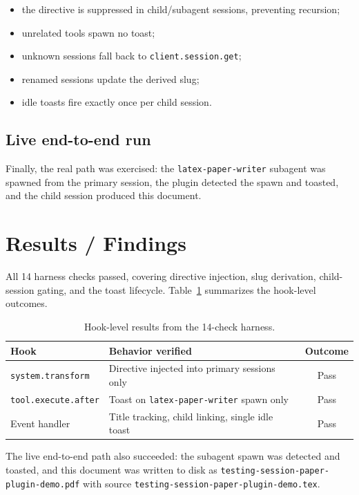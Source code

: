 \documentclass[11pt]{article}
\begin{document}
\begin{itemize}
  \item the directive is suppressed in child/subagent sessions, preventing recursion;
  \item unrelated tools spawn no toast;
  \item unknown sessions fall back to \texttt{client.session.get};
  \item renamed sessions update the derived slug;
  \item idle toasts fire exactly once per child session.
\end{itemize}

\subsection{Live end-to-end run}
Finally, the real path was exercised: the \texttt{latex-paper-writer} subagent was spawned
from the primary session, the plugin detected the spawn and toasted, and the child session
produced this document.

\section{Results / Findings}
\label{sec:results}

All 14 harness checks passed, covering directive injection, slug derivation,
child-session gating, and the toast lifecycle. Table~\ref{tab:hooks} summarizes the
hook-level outcomes.

\begin{table}[h]
  \centering
  \begin{tabular}{@{}llc@{}}
    \toprule
    Hook & Behavior verified & Outcome \\
    \midrule
    \texttt{system.transform} & Directive injected into primary sessions only & Pass \\
    \texttt{tool.execute.after} & Toast on \texttt{latex-paper-writer} spawn only & Pass \\
    Event handler & Title tracking, child linking, single idle toast & Pass \\
    \bottomrule
  \end{tabular}
  \caption{Hook-level results from the 14-check harness.}
  \label{tab:hooks}
\end{table}

The live end-to-end path also succeeded: the subagent spawn was detected and toasted, and
this document was written to disk as \texttt{testing-session-paper-plugin-demo.pdf} with
source \texttt{testing-session-paper-plugin-demo.tex}.
\end{document}
